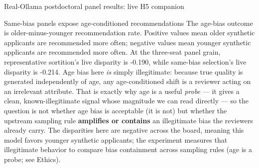 \documentclass[
  ignorenonframetext,
]{beamer}
\begin{document}
\begin{frame}{Real-Ollama postdoctoral panel
results: live H5 companion}
\begin{block}{Same-bias panels expose age-conditioned recommendations}
\protect{}\label{same-bias-panels-expose-age-conditioned-recommendations}
The age-bias outcome is older-minus-younger recommendation rate.
Positive values mean older synthetic applicants are recommended more
often; negative values mean younger synthetic applicants are recommended
more often. At the three-seat panel grain, representative sortition's
live disparity is -0.190, while same-bias selection's live disparity is
-0.214. Age bias here \emph{is} simply illegitimate: because true
quality is generated independently of age, any age-conditioned shift is
a reviewer acting on an irrelevant attribute. That is exactly why age is
a useful \emph{probe} --- it gives a clean, known-illegitimate signal
whose magnitude we can read directly --- so the question is not whether
age bias is acceptable (it is not) but whether the upstream sampling
rule \textbf{amplifies or contains} an illegitimate bias the reviewers
already carry. The disparities here are negative across the board,
meaning this model favors younger synthetic applicants; the experiment
measures that illegitimate behavior to compare bias containment across
sampling rules (age is a probe; see Ethics).


\end{block}
\end{frame}
\end{document}
